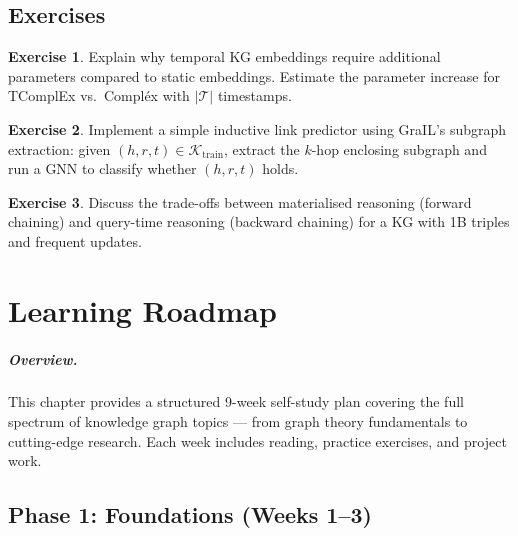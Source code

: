 \documentclass[11pt,a4paper,oneside,openany]{book}
\theoremstyle{definition}
\newtheorem{exercise}{Exercise}[chapter]
\theoremstyle{plain}
\theoremstyle{remark}
\newcommand{\cT}{\mathcal{T}}
\newcommand{\kg}{\mathcal{K}}
\begin{document}
\section{Exercises}

\begin{exercise}
	Explain why temporal KG embeddings require additional parameters compared to static embeddings. Estimate the parameter increase for TComplEx vs.\ Compl\'{e}x with $|\cT|$ timestamps.
\end{exercise}

\begin{exercise}
	Implement a simple inductive link predictor using GraIL's subgraph extraction: given $(h, r, t) \in \kg_{\text{train}}$, extract the $k$-hop enclosing subgraph and run a GNN to classify whether $(h, r, t)$ holds.
\end{exercise}

\begin{exercise}
	Discuss the trade-offs between materialised reasoning (forward chaining) and query-time reasoning (backward chaining) for a KG with 1B triples and frequent updates.
\end{exercise}

\chapter{Learning Roadmap}\label{ch:roadmap}

\paragraph{Overview.}
This chapter provides a structured 9-week self-study plan covering the full spectrum of knowledge graph topics --- from graph theory fundamentals to cutting-edge research. Each week includes reading, practice exercises, and project work.

\section{Phase 1: Foundations (Weeks 1--3)}\label{sec:phase1}
\end{document}
